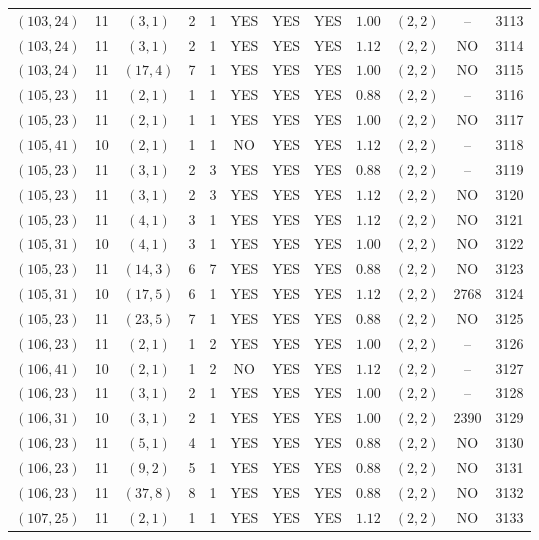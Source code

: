 \begin{longtable}{|c|c|c|c|c|c|c|c|c|c|c|c|}
$(103,24)$ & 11 & $(3,1)$ & 2 & 1 & YES & YES & YES & $1.00$ & $(2,2)$ & -- & 3113\\
$(103,24)$ & 11 & $(3,1)$ & 2 & 1 & YES & YES & YES & $1.12$ & $(2,2)$ & NO & 3114\\
$(103,24)$ & 11 & $(17,4)$ & 7 & 1 & YES & YES & YES & $1.00$ & $(2,2)$ & NO & 3115\\
$(105,23)$ & 11 & $(2,1)$ & 1 & 1 & YES & YES & YES & $0.88$ & $(2,2)$ & -- & 3116\\
$(105,23)$ & 11 & $(2,1)$ & 1 & 1 & YES & YES & YES & $1.00$ & $(2,2)$ & NO & 3117\\
$(105,41)$ & 10 & $(2,1)$ & 1 & 1 & NO & YES & YES & $1.12$ & $(2,2)$ & -- & 3118\\
$(105,23)$ & 11 & $(3,1)$ & 2 & 3 & YES & YES & YES & $0.88$ & $(2,2)$ & -- & 3119\\
$(105,23)$ & 11 & $(3,1)$ & 2 & 3 & YES & YES & YES & $1.12$ & $(2,2)$ & NO & 3120\\
$(105,23)$ & 11 & $(4,1)$ & 3 & 1 & YES & YES & YES & $1.12$ & $(2,2)$ & NO & 3121\\
$(105,31)$ & 10 & $(4,1)$ & 3 & 1 & YES & YES & YES & $1.00$ & $(2,2)$ & NO & 3122\\
$(105,23)$ & 11 & $(14,3)$ & 6 & 7 & YES & YES & YES & $0.88$ & $(2,2)$ & NO & 3123\\
$(105,31)$ & 10 & $(17,5)$ & 6 & 1 & YES & YES & YES & $1.12$ & $(2,2)$ & 2768 & 3124\\
$(105,23)$ & 11 & $(23,5)$ & 7 & 1 & YES & YES & YES & $0.88$ & $(2,2)$ & NO & 3125\\
$(106,23)$ & 11 & $(2,1)$ & 1 & 2 & YES & YES & YES & $1.00$ & $(2,2)$ & -- & 3126\\
$(106,41)$ & 10 & $(2,1)$ & 1 & 2 & NO & YES & YES & $1.12$ & $(2,2)$ & -- & 3127\\
$(106,23)$ & 11 & $(3,1)$ & 2 & 1 & YES & YES & YES & $1.00$ & $(2,2)$ & -- & 3128\\
$(106,31)$ & 10 & $(3,1)$ & 2 & 1 & YES & YES & YES & $1.00$ & $(2,2)$ & 2390 & 3129\\
$(106,23)$ & 11 & $(5,1)$ & 4 & 1 & YES & YES & YES & $0.88$ & $(2,2)$ & NO & 3130\\
$(106,23)$ & 11 & $(9,2)$ & 5 & 1 & YES & YES & YES & $0.88$ & $(2,2)$ & NO & 3131\\
$(106,23)$ & 11 & $(37,8)$ & 8 & 1 & YES & YES & YES & $0.88$ & $(2,2)$ & NO & 3132\\
$(107,25)$ & 11 & $(2,1)$ & 1 & 1 & YES & YES & YES & $1.12$ & $(2,2)$ & NO & 3133\\

\end{longtable}
